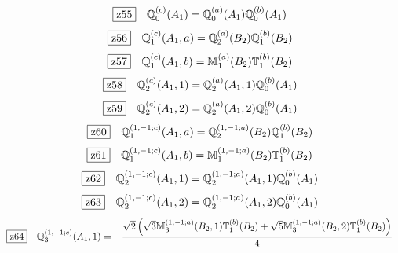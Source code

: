 \documentclass[fleqn,10pt,landscape]{jsarticle}
\begin{document}
\begin{dmath*}
\hspace*{3mm}\fbox{z55}\quad \mathbb{Q}_{0}^{(c)}(A_{1})=\mathbb{Q}_{0}^{(a)}(A_{1}) \mathbb{Q}_{0}^{(b)}(A_{1})
\end{dmath*}
\begin{dmath*}
\hspace*{3mm}\fbox{z56}\quad \mathbb{Q}_{1}^{(c)}(A_{1},a)=\mathbb{Q}_{2}^{(a)}(B_{2}) \mathbb{Q}_{1}^{(b)}(B_{2})
\end{dmath*}
\begin{dmath*}
\hspace*{3mm}\fbox{z57}\quad \mathbb{Q}_{1}^{(c)}(A_{1},b)=\mathbb{M}_{1}^{(a)}(B_{2}) \mathbb{T}_{1}^{(b)}(B_{2})
\end{dmath*}
\begin{dmath*}
\hspace*{3mm}\fbox{z58}\quad \mathbb{Q}_{2}^{(c)}(A_{1},1)=\mathbb{Q}_{2}^{(a)}(A_{1},1) \mathbb{Q}_{0}^{(b)}(A_{1})
\end{dmath*}
\begin{dmath*}
\hspace*{3mm}\fbox{z59}\quad \mathbb{Q}_{2}^{(c)}(A_{1},2)=\mathbb{Q}_{2}^{(a)}(A_{1},2) \mathbb{Q}_{0}^{(b)}(A_{1})
\end{dmath*}
\begin{dmath*}
\hspace*{3mm}\fbox{z60}\quad \mathbb{Q}_{1}^{(1,-1;c)}(A_{1},a)=\mathbb{Q}_{2}^{(1,-1;a)}(B_{2}) \mathbb{Q}_{1}^{(b)}(B_{2})
\end{dmath*}
\begin{dmath*}
\hspace*{3mm}\fbox{z61}\quad \mathbb{Q}_{1}^{(1,-1;c)}(A_{1},b)=\mathbb{M}_{1}^{(1,-1;a)}(B_{2}) \mathbb{T}_{1}^{(b)}(B_{2})
\end{dmath*}
\begin{dmath*}
\hspace*{3mm}\fbox{z62}\quad \mathbb{Q}_{2}^{(1,-1;c)}(A_{1},1)=\mathbb{Q}_{2}^{(1,-1;a)}(A_{1},1) \mathbb{Q}_{0}^{(b)}(A_{1})
\end{dmath*}
\begin{dmath*}
\hspace*{3mm}\fbox{z63}\quad \mathbb{Q}_{2}^{(1,-1;c)}(A_{1},2)=\mathbb{Q}_{2}^{(1,-1;a)}(A_{1},2) \mathbb{Q}_{0}^{(b)}(A_{1})
\end{dmath*}
\begin{dmath*}
\hspace*{3mm}\fbox{z64}\quad \mathbb{Q}_{3}^{(1,-1;c)}(A_{1},1)=- \frac{\sqrt{2} \left(\sqrt{3} \mathbb{M}_{3}^{(1,-1;a)}(B_{2},1) \mathbb{T}_{1}^{(b)}(B_{2}) + \sqrt{5} \mathbb{M}_{3}^{(1,-1;a)}(B_{2},2) \mathbb{T}_{1}^{(b)}(B_{2})\right)}{4}
\end{dmath*}
\end{document}
